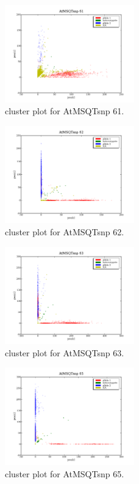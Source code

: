 \begin{figure}[H]
\includegraphics[width=0.5\textwidth]{figures/cluster_plot_AtMSQTsnp_61.png}
\caption{cluster plot for AtMSQTsnp 61.} \label{flAtMSQTsnp61}
\end{figure}
\begin{figure}[H]
\includegraphics[width=0.5\textwidth]{figures/cluster_plot_AtMSQTsnp_62.png}
\caption{cluster plot for AtMSQTsnp 62.} \label{flAtMSQTsnp62}
\end{figure}
\begin{figure}[H]
\includegraphics[width=0.5\textwidth]{figures/cluster_plot_AtMSQTsnp_63.png}
\caption{cluster plot for AtMSQTsnp 63.} \label{flAtMSQTsnp63}
\end{figure}
\begin{figure}[H]
\includegraphics[width=0.5\textwidth]{figures/cluster_plot_AtMSQTsnp_65.png}
\caption{cluster plot for AtMSQTsnp 65.} \label{flAtMSQTsnp65}
\end{figure}
